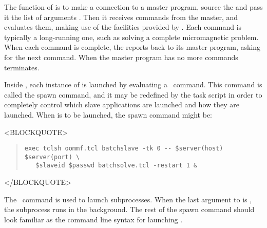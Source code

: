 The function of  is to make a connection to
a master program, source the  and pass it the
list of arguments .  Then it receives commands
from the master, and evaluates them, making use of the
facilities provided by .  Each command is typically a
long-running one, such as solving a complete micromagnetic problem.
When each command is complete, the  reports back to
its master program, asking for the next command.  When the master
program has no more commands  terminates.

Inside , each instance of  is
launched by evaluating a \Tcl\ command.  This command is called
the spawn command, and it may be redefined by the task script
in order to completely control which slave applications are launched
and how they are launched.  When  is to be launched,
the spawn command might be:
\begin{rawhtml}
<BLOCKQUOTE>
\end{rawhtml}
\begin{quote}
\begin{verbatim}
exec tclsh oommf.tcl batchslave -tk 0 -- $server(host) $server(port) \
   $slaveid $passwd batchsolve.tcl -restart 1 &
\end{verbatim}
\end{quote}
\begin{rawhtml}
</BLOCKQUOTE>
\end{rawhtml}
The \Tcl\ command  is used to launch subprocesses.  When
the last argument to \cd{exec} is \cd{\&}, the subprocess runs in
the background.  The rest of the spawn command should look familiar
as the command line syntax for launching \app{batchslave}.

